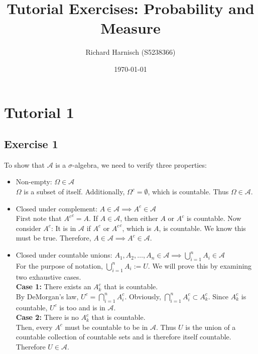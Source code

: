 \documentclass{article}
\title{Tutorial Exercises: Probability and Measure}
\author{Richard Harnisch (S5238366)}
\date{\today}
\begin{document}
\maketitle
\sloppy

\section*{Tutorial 1}
\subsection*{Exercise 1}

To show that $\mathcal{A}$ is a $\sigma$-algebra, we need to verify three properties:
\begin{itemize}
    \item Non-empty: $\Omega \in \mathcal{A}$ \\
    $\Omega$ is a subset of itself. Additionally, $\Omega^c = \emptyset$, which is countable. Thus $\Omega \in \mathcal{A}$.

    \item Closed under complement: $A \in \mathcal{A} \implies A^c \in \mathcal{A}$ \\
    First note that ${A^c}^c = A$. If $A \in \mathcal{A}$, then either $A$ or $A^c$ is countable. Now consider $A^c$: It is in $\mathcal{A}$ if $A^c$ or ${A^c}^c$, which is $A$, is countable. We know this must be true. Therefore, $A \in \mathcal{A} \implies A^c \in \mathcal{A}$. 

    \item Closed under countable unions: $A_1, A_2, \dots, A_n \in \mathcal{A} \implies \bigcup_{i=1}^{n} A_i \in \mathcal{A}$ \\
    For the purpose of notation, $\bigcup_{i=1}^{n} A_i := U$. We will prove this by examining two exhaustive cases. \\
    \textbf{Case 1:} There exists an $A^c_k$ that is countable. \\
    By DeMorgan's law, $U^c = \bigcap_{i=1}^{n} A^c_i$. Obviously, $\bigcap_{i=1}^{n} A^c_i \subset A^c_k$. Since $A^c_k$ is countable, $U^c$ is too and is in $\mathcal{A}$. \\
    \textbf{Case 2:} There is no $A^c_k$ that is countable. \\
    Then, every $A^c$ must be countable to be in $\mathcal{A}$. Thus $U$ is the union of a countable collection of countable sets and is therefore itself countable. Therefore $U \in \mathcal{A}$.
\end{itemize}
\pagebreak
\end{document}

